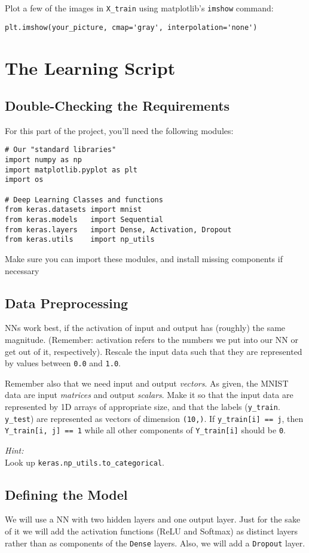 \documentclass[
	english,
	fontsize=10pt,
	parskip=half,
	titlepage=true,
	DIV=12
]{scrartcl}
\begin{document}
Plot a few of the images in \texttt{X\_train} using matplotlib's \texttt{imshow} command:
\begin{verbatim}
plt.imshow(your_picture, cmap='gray', interpolation='none')
\end{verbatim}

\section{The Learning Script}
\subsection{Double-Checking the Requirements}
For this part of the project, you'll need the following modules:
\begin{verbatim}
# Our "standard libraries"
import numpy as np
import matplotlib.pyplot as plt
import os

# Deep Learning Classes and functions
from keras.datasets import mnist
from keras.models   import Sequential
from keras.layers   import Dense, Activation, Dropout
from keras.utils    import np_utils
\end{verbatim}

Make sure you can import these modules, and install missing components if necessary

\subsection{Data Preprocessing}
NNs work best, if the activation of input and output has (roughly) the same magnitude. (Remember: activation refers to the numbers we put into our NN or get out of it, respectively). Rescale the input data such that they are represented by values between \texttt{0.0} and \texttt{1.0}.

Remember also that we need input and output \emph{vectors}. As given, the MNIST data are input \emph{matrices} and output \emph{scalars}. Make it so that the input data are represented by 1D arrays of appropriate size, and that the labels (\texttt{y\_train}. \texttt{y\_test}) are represented as vectors of dimension \texttt{(10,)}. If \texttt{y\_train[i] == j}, then \texttt{Y\_train[i, j] == 1} while all other components of \texttt{Y\_train[i]} should be \texttt{0}.

\emph{Hint:}\\
Look up \texttt{keras.np\_utils.to\_categorical}.

\subsection{Defining the Model}
We will use a NN with two hidden layers and one output layer. Just for the sake of it we will add the activation functions (ReLU and Softmax) as distinct layers rather than as components of the \texttt{Dense} layers. Also, we will add a \texttt{Dropout} layer.
\end{document}
